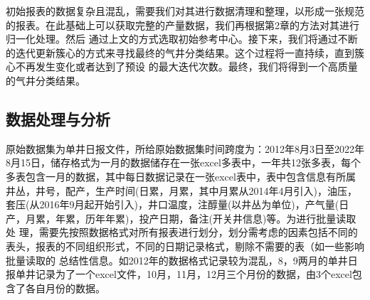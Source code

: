 初始报表的数据复杂且混乱，需要我们对其进行数据清理和整理，以形成一张规范的报表。在此基础上可以获取完整的产量数据，我们再根据第2章的方法对其进行归一化处理。然后
通过上文的方式选取初始参考中心。接下来，我们将通过不断的迭代更新簇心的方式来寻找最终的气井分类结果。这个过程将一直持续，直到簇心不再发生变化或者达到了预设
的最大迭代次数。最终，我们将得到一个高质量的气井分类结果。
\subsection{数据处理与分析}
原始数据集为单井日报文件，所给原始数据集时间跨度为：2012年8月3日至2022年8月15日，储存格式为一月的数据储存在一张excel多表中，一年共12张多表，每个
多表包含一月的数据，其中每日数据记录在一张excel表中，表中包含信息有所属井丛，井号，配产，生产时间(日累，月累，其中月累从2014年4月引入)，油压，
套压(从2016年9月起开始引入)，井口温度，注醇量(以井丛为单位)，产气量(日产，月累，年累，历年年累)，投产日期，备注(开关井信息)等。为进行批量读取处
理，需要先按照数据格式对所有报表进行划分，划分需考虑的因素包括不同的表头，报表的不同组织形式，不同的日期记录格式，剔除不需要的表（如一些影响批量读取的
总结性信息。如2012年的数据格式记录较为混乱，8，9两月的单井日报单井记录为了一个excel文件，10月，11月，12月三个月份的数据，由3个excel包含了各自月份的数据。
